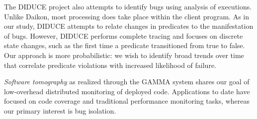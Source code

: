 The DIDUCE project \cite{Hangal:DIDUCE:2002} also attempts to identify
bugs using analysis of executions.  Unlike Daikon, most
processing does take place within the client program.  As in our
study, DIDUCE attempts to relate changes in predicates to the
manifestation of bugs.  However, DIDUCE performs complete tracing and
focuses on discrete state changes, such as the first time a predicate
transitioned from true to false.  Our approach is more probabilistic:
we wish to identify broad trends over time that correlate predicate
violations with increased likelihood of failure.

{\em Software tomography} as realized through the GAMMA system
\cite{PASTE'02*2} shares our goal of low-overhead distributed
monitoring of deployed code.  Applications to date have focused on
code coverage and traditional performance monitoring tasks, whereas
our primary interest is bug isolation.  

